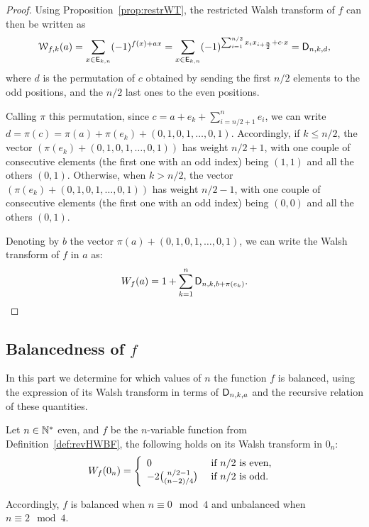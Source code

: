 \documentclass[11pt]{llncs}
\begin{document}
\begin{proof}
Using Proposition~\ref{prop:restrWT}, the restricted Walsh transform of $f$ can then be written as \[
\mathcal{W}_{f,k}(a)=\sum_{x \in \mathsf{E}_{k,n}} (-1)^{f(x)+ax}=\sum_{x \in \mathsf{E}_{k,n}} (-1)^{\sum_{i=1}^{n/2} x_i x_{i+\frac{n}{2}}+ c \cdot x}=\mathsf{D}_{n,k,d},\]
where $d$ is the permutation of $c$ obtained by sending the first $n/2$ elements to the odd positions, and the $n/2$ last ones to the even positions. 

Calling $\pi$ this permutation, since $c=a+e_k+\sum_{i=n/2+1}^n e_i$, we can write $d=\pi(c)=\pi(a)+ \pi(e_k)+ (0,1,0,1,\ldots,0,1)$. 
Accordingly, if $k\le n/2$, the vector $(\pi(e_k)+ (0,1,0,1,\ldots,0,1))$ has weight $n/2+1$, with one couple of consecutive elements (the first one with an odd index) being $(1,1)$ and all the others $(0,1)$. 
Otherwise,  when $k> n/2$, the vector $(\pi(e_k)+ (0,1,0,1,\ldots,0,1))$ has weight $n/2-1$, with one couple of consecutive elements (the first one with an odd index) being $(0,0)$ and all the others $(0,1)$. 

Denoting by $b$ the vector $\pi(a)+(0,1,0,1,\ldots,0,1)$, we can write the Walsh transform of $f$ in $a$ as:
\[ W_{f}(a)=1+\sum_{k=1}^n\mathsf{D}_{n,k,b+\pi(e_k)}.\]
\end{proof}

\subsection{Balancedness of $f$}\label{sec:balancedness}

In this part we determine for which values of $n$ the function $f$ is balanced, using the expression of its Walsh transform in terms of $\mathsf{D}_{n,k,a}$ and the recursive relation of these quantities.


\begin{theorem}[Balancedness of $f$]
	Let $n \in \mathbb{N}^*$ even, and $f$ be the $n$-variable function from Definition~\ref{def:revHWBF}, the following holds on its Walsh transform in $0_n$:
	\[W_{f}(0_n)= \left \{
	\begin{array}{l l}
	0 & \text{ if } n/2 \text{ is even, } \\
	-2 \binom{n/2-1}{(n-2)/4} & \text{ if }  n/2 \text{ is odd.}
	\end{array}\right.\]
	
	Accordingly, $f$ is balanced when $n \equiv 0\mod 4$ and unbalanced when $n\equiv 2 \mod 4$.
	
\end{theorem}
\end{document}
